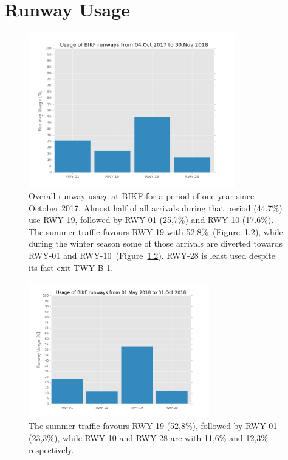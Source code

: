 


\chapter{Runway Usage}\label{cha:RWY_usage}


\begin{figure}[h]
    \centering
    \includegraphics[width=0.8\textwidth]{graphics/fig_runway_usage_2017-10-04_to_2018-11-30.png}
    \caption[Runway usage at BIKF]{Overall runway usage at BIKF for a period of one year since October 2017. Almost half of all arrivals during that period (44,7\%) use RWY-19, followed by RWY-01 (25,7\%) and RWY-10 (17.6\%). The summer traffic favours RWY-19 with 52.8\%~(Figure~\ref{fig:runway_usage_summer}), while during the winter season some of those arrivals are diverted towards RWY-01 and RWY-10~(Figure~\ref{fig:runway_usage_summer}). RWY-28 is least used despite its fast-exit TWY B-1.}
    \label{fig:runway_usage}
\end{figure}


\begin{figure}[h]
    \centering
    \includegraphics[width=0.7\textwidth]{graphics/fig_runway_usage_summer}
    \caption[Summer runway usage at BIKF]{The summer traffic favours RWY-19 (52,8\%), followed by RWY-01 (23,3\%), while RWY-10 and RWY-28 are with 11,6\% and 12,3\% respectively.}
    \label{fig:runway_usage_summer}
\end{figure}


